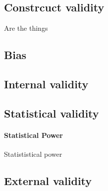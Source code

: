 \documentclass{tufte-book}
\begin{document}
\subsection{Constrcuct validity}

Are the things 

\subsection{Bias}


\citep{Ransohoff-Biasasthreat-2005}

\subsection{Internal validity}


\subsection{Statistical validity}


\paragraph{Statistical Power} Statististical power


\subsection{External validity}
\end{document}
